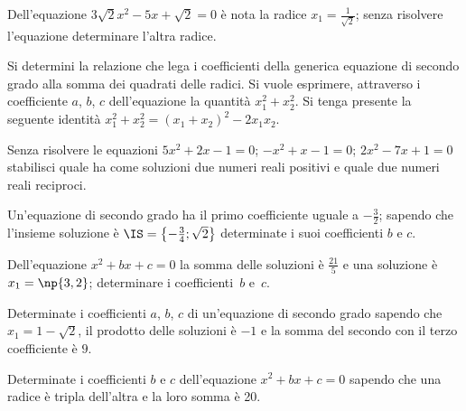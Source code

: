 \begin{esercizio}
 \label{ese:3.80}
Dell'equazione $3 \sqrt{2} x^{2}-5 x + \sqrt{2} = 0$ è nota la radice $x_{1} = \frac{1}{\sqrt{2}}$; senza risolvere l'equazione determinare l'altra radice.
\end{esercizio}

\begin{esercizio}
 \label{ese:3.81}
Si determini la relazione che lega i coefficienti della generica equazione di secondo grado alla somma dei quadrati delle radici. Si vuole esprimere,
attraverso i coefficiente $a$, $b$, $c$ dell'equazione la quantità $x_{1}^{2} + x_{2}^{2}$. Si tenga presente la seguente identità $x_{1}^{2} + x_{2}^{2} = (x_{1} + x_{2} )^{2}-2 x_{1} x_{2}$.
\end{esercizio}

\begin{esercizio}
 \label{ese:3.82}
Senza risolvere le equazioni $ 5 x^{2} + 2 x-1 = 0$; $-x^{2} + x-1 = 0$; $2 x^{2}-7 x +1 = 0$ stabilisci quale ha come soluzioni due numeri reali positivi e quale due numeri reali reciproci.
\end{esercizio}

\begin{esercizio}[\Ast]
 \label{ese:3.83}
Un'equazione di secondo grado ha il primo coefficiente uguale a $- \frac{3}{2}$; sapendo che l'insieme soluzione è $\IS = \left\{-\frac{3}{4};\sqrt{2} \right\}$
determinate i suoi coefficienti $b$ e $c$.
\end{esercizio}

\begin{esercizio}
 \label{ese:3.84}
Dell'equazione $x^{2} + b x + c = 0$ la somma delle soluzioni è $\frac{21}{5}$ e una soluzione è $x_{1} = \np{3,2}$; determinare i coefficienti~$b$ e~$c$.
\end{esercizio}

\begin{esercizio}
 \label{ese:3.85}
Determinate i coefficienti $a$, $b$, $c$ di un'equazione di secondo grado sapendo che $x_{1} = 1-\sqrt{2}$, il prodotto delle soluzioni è $-1$
e la somma del secondo con il terzo coefficiente è $9$.
\end{esercizio}

\begin{esercizio}
 \label{ese:3.86}
Determinate i coefficienti $b$ e $c$ dell'equazione $x^{2} + b x + c = 0$ sapendo che una radice è tripla dell'altra e la loro somma è 20.
\end{esercizio}

